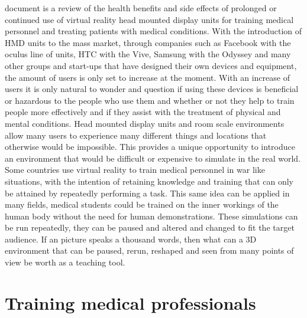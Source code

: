 \documentclass[10pt,journal,compsoc]{IEEEtran}
\begin{document}
	 document is a review of the health benefits and side effects of prolonged or continued use of virtual reality head mounted display units for training medical personnel and treating patients with medical conditions. With the introduction of HMD units to the mass market, through companies such as Facebook with the oculus line of units, HTC with the Vive, Samsung with the Odyssey and many other groups and start-ups that have designed their own devices and equipment, the amount of users is only set to increase at the moment. With an increase of users it is only natural to wonder and question if using these devices is beneficial or hazardous to the people who use them and whether or not they help to train people more effectively and if they assist with the treatment of physical and mental conditions. \newline \newline
	Head mounted display units and room scale environments allow many users to experience many different things and locations that otherwise would be impossible. This provides a unique opportunity to introduce an environment that would be difficult or expensive to simulate in the real world. Some countries use virtual reality to train medical personnel in war like situations, with the intention of retaining knowledge and training that can only be attained by repeatedly performing a task. This same idea can be applied in many fields,  medical students could be trained on the inner workings of the human body without the need for human demonstrations. These simulations can be run repeatedly, they can be paused and altered and changed to fit the target audience. If an picture speaks a thousand words, then what can a 3D environment that can be paused, rerun, reshaped and seen from many points of view be worth as a teaching tool.
	\newline
	
	
	
	\section{Training medical professionals}
	
\end{document}
